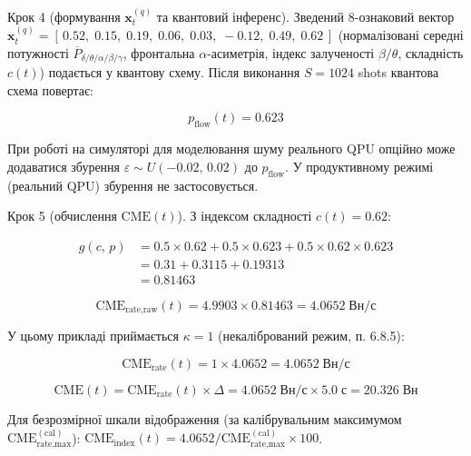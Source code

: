 \documentclass[12pt,a4paper]{article}
\begin{document}
Крок 4 (формування \(\mathbf{x}_t^{(q)}\) та квантовий інференс). Зведений 8-ознаковий вектор \(\mathbf{x}_t^{(q)} = [\,0.52,\;0.15,\;0.19,\;0.06,\;0.03,\;-0.12,\;0.49,\;0.62\,]\) (нормалізовані середні потужності \(\overline{P}_{\delta/\theta/\alpha/\beta/\gamma}\), фронтальна \(\alpha\)-асиметрія, індекс залученості \(\beta/\theta\), складність \(c(t)\)) подається у квантову схему. Після виконання \(S = 1024\) shots квантова схема повертає:



\[p_{\text{flow}}(t) = 0.623\]



При роботі на симуляторі для моделювання шуму реального QPU опційно може додаватися збурення \(\varepsilon \sim U(-0.02,\,0.02)\) до \(p_{\text{flow}}\). У продуктивному режимі (реальний QPU) збурення не застосовується.



Крок 5 (обчислення \(\text{CME}(t)\)). З індексом складності \(c(t) = 0.62\):



\[\begin{aligned}

g(c,\,p) &= 0.5 \times 0.62 + 0.5 \times 0.623 + 0.5 \times 0.62 \times 0.623 \\

&= 0.31 + 0.3115 + 0.19313 \\

&= 0.81463

\end{aligned}\]



\[\text{CME}_{\text{rate,raw}}(t) = 4.9903 \times 0.81463 = 4.0652 \;\text{Вн/с}\]



У цьому прикладі приймається \(\kappa = 1\) (некалібрований режим, п. 6.8.5):



\[\text{CME}_{\text{rate}}(t) = 1 \times 4.0652 = 4.0652 \;\text{Вн/с}\]



\[\text{CME}(t) = \text{CME}_{\text{rate}}(t) \times \Delta = 4.0652 \;\text{Вн/с} \times 5.0 \;\text{с} = 20.326 \;\text{Вн}\]



Для безрозмірної шкали відображення (за калібрувальним максимумом \(\text{CME}_{\text{rate,max}}^{(\text{cal})}\)): \(\text{CME}_{\text{index}}(t) = 4.0652 / \text{CME}_{\text{rate,max}}^{(\text{cal})} \times 100\).
\end{document}
